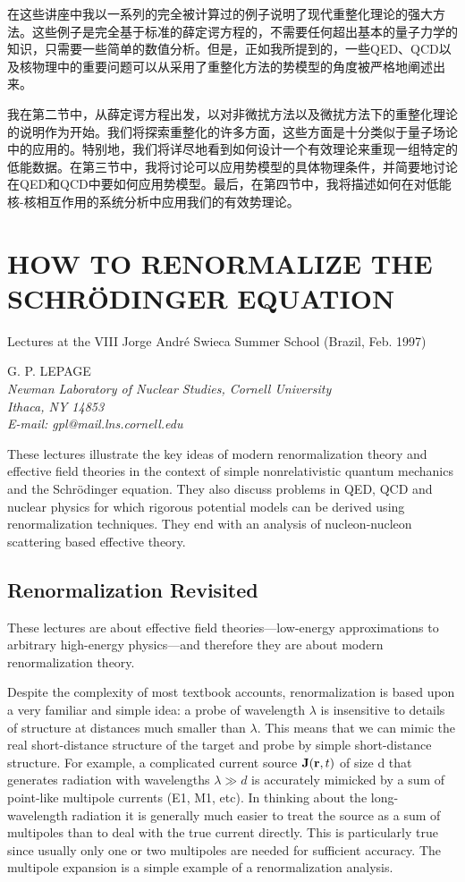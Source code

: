 \documentclass[cs4size,titlepage,twoside]{ctexart}
\begin{document}
\begin{appendices}
在这些讲座中我以一系列的完全被计算过的例子说明了现代重整化理论的强大方法。这些例子是完全基于标准的薛定谔方程的，不需要任何超出基本的量子力学的知识，只需要一些简单的数值分析。但是，正如我所提到的，一些QED、QCD以及核物理中的重要问题可以从采用了重整化方法的势模型的角度被严格地阐述出来。

我在第二节中，从薛定谔方程出发，以对非微扰方法以及微扰方法下的重整化理论的说明作为开始。我们将探索重整化的许多方面，这些方面是十分类似于量子场论中的应用的。特别地，我们将详尽地看到如何设计一个有效理论来重现一组特定的低能数据。在第三节中，我将讨论可以应用势模型的具体物理条件，并简要地讨论在QED和QCD中要如何应用势模型。最后，在第四节中，我将描述如何在对低能核-核相互作用的系统分析中应用我们的有效势理论。

\section{HOW TO RENORMALIZE THE SCHR\"ODINGER EQUATION}
Lectures at the VIII Jorge Andr\'e Swieca Summer School (Brazil, Feb. 1997)
\begin{center}
G. P. LEPAGE\\
\emph{Newman Laboratory of Nuclear Studies, Cornell University\\
Ithaca, NY 14853\\
E-mail: gpl@mail.lns.cornell.edu}
\end{center}
\begin{adjustwidth}{1cm}{1cm}
\noindent These lectures illustrate the key ideas of modern renormalization theory and effective
field theories in the context of simple nonrelativistic quantum mechanics and
the Schr\"odinger equation. They also discuss problems in QED, QCD and nuclear
physics for which rigorous potential models can be derived using renormalization
techniques. They end with an analysis of nucleon-nucleon scattering based effective
theory.
\end{adjustwidth}
\subsection{Renormalization Revisited}
These lectures are about effective field theories—low-energy approximations
to arbitrary high-energy physics—and therefore they are about modern renormalization
theory.

Despite the complexity of most textbook accounts, renormalization is
based upon a very familiar and simple idea: a probe of wavelength $\lambda$ is insensitive
to details of structure at distances much smaller than $\lambda$. This means that
we can mimic the real short-distance structure of the target and probe by simple
short-distance structure. For example, a complicated current source $\vb{J}(\vb{r},t)$
of size d that generates radiation with wavelengths $\lambda\gg d$ is accurately mimicked
by a sum of point-like multipole currents (E1, M1, etc). In thinking
about the long-wavelength radiation it is generally much easier to treat the
source as a sum of multipoles than to deal with the true current directly. This
is particularly true since usually only one or two multipoles are needed for
sufficient accuracy. The multipole expansion is a simple example of a renormalization
analysis.


\end{appendices}
\end{document}
